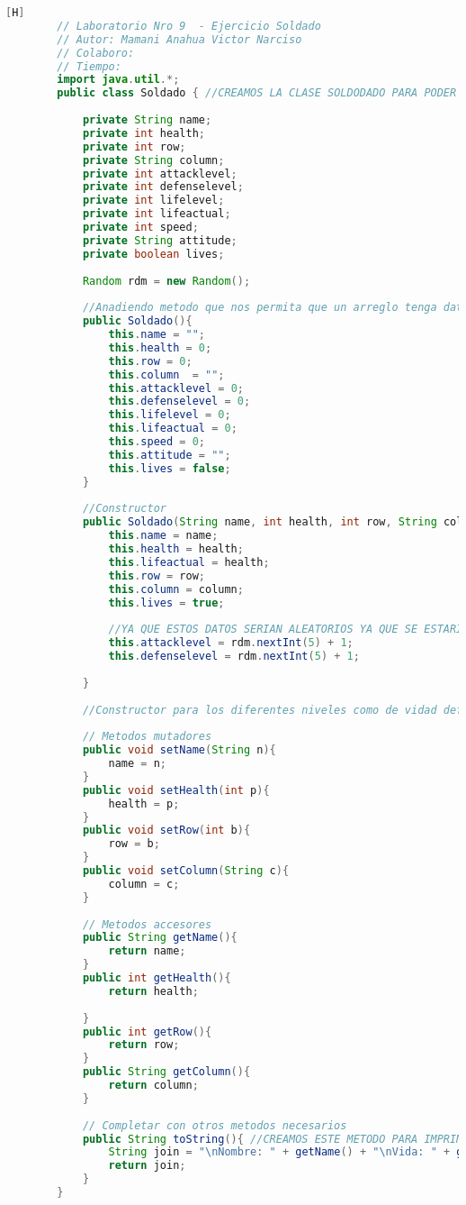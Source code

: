 \documentclass{article}
\begin{document}
	\begin{lstlisting}[language=java,caption={Las lineas de codigos del metodo creado:}][H]
		// Laboratorio Nro 9  - Ejercicio Soldado
		// Autor: Mamani Anahua Victor Narciso
		// Colaboro:
		// Tiempo:
		import java.util.*;
		public class Soldado { //CREAMOS LA CLASE SOLDODADO PARA PODER USAR UN ARREGLO BIDIMENSIONAL DONDE NECESITAMOS LA VIDA , EL NOMBRE DEL SOLDADO Y TAMBIEN SU POSICION COMO LA FILA Y LA COLUMNA   
		
			private String name;
			private int health;
			private int row;
			private String column;
			private int attacklevel;
			private int defenselevel;
			private int lifelevel;
			private int lifeactual;
			private int speed;
			private String attitude;
			private boolean lives;
		
			Random rdm = new Random();
		
			//Anadiendo metodo que nos permita que un arreglo tenga datos nulos si este esta vacio
			public Soldado(){
				this.name = "";
				this.health = 0;
				this.row = 0;
				this.column  = "";
				this.attacklevel = 0;
				this.defenselevel = 0;
				this.lifelevel = 0;
				this.lifeactual = 0;
				this.speed = 0;
				this.attitude = "";
				this.lives = false;
			}
		
			//Constructor
			public Soldado(String name, int health, int row, String column){
				this.name = name;
				this.health = health;
				this.lifeactual = health;
				this.row = row;
				this.column = column;
				this.lives = true;
		
				//YA QUE ESTOS DATOS SERIAN ALEATORIOS YA QUE SE ESTARIA CREANDO EL SOLDADO TENDRIAMOS DATOS QUE SERIAN COMO ATTACKLEVEL DEFENSELEVEL EL CUAL TENDRIAN QUE SER ALEATORIOS    
				this.attacklevel = rdm.nextInt(5) + 1;
				this.defenselevel = rdm.nextInt(5) + 1;
		
			}
		
			//Constructor para los diferentes niveles como de vidad defensa ataque velocidad
		
			// Metodos mutadores
			public void setName(String n){
				name = n;
			}
			public void setHealth(int p){
				health = p;
			}
			public void setRow(int b){
				row = b;
			}
			public void setColumn(String c){
				column = c; 
			}
		
			// Metodos accesores
			public String getName(){
				return name;
			}
			public int getHealth(){
				return health;
		
			}
			public int getRow(){
				return row;
			}
			public String getColumn(){
				return column;
			}
		
			// Completar con otros metodos necesarios
			public String toString(){ //CREAMOS ESTE METODO PARA IMPRIMIR LOS DATOS DEl OBJETO
				String join = "\nNombre: " + getName() + "\nVida: " + getHealth() + "\nFila: " + getRow() + "\nColumna: " + getColumn(); //Agregamos un espaciador para poder separar
				return join;
			}
		}

	\end{lstlisting}
\end{document}
